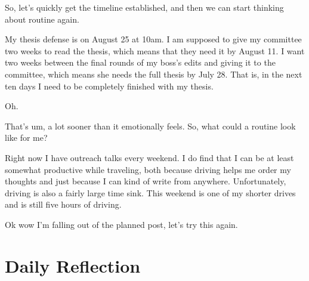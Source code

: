 \documentclass[12pt]{article}
\renewcommand{\,}{\textsuperscript{,}}
\begin{document}
So, let's quickly get the timeline established, and then we can start thinking about routine again.

My thesis defense is on August 25 at 10am.  
I am supposed to give my committee two weeks to read the thesis, which means that they need it by August 11.  
I want two weeks between the final rounds of my boss's edits and giving it to the committee, which means she needs the full thesis by July 28.  
That is, in the next ten days I need to be completely finished with my thesis.

Oh.

That's um, a lot sooner than it emotionally feels.  
So, what could a routine look like for me?

Right now I have outreach talks every weekend.  
I do find that I can be at least somewhat productive while traveling, both because driving helps me order my thoughts and just because I can kind of write from anywhere.  
Unfortunately, driving is also a fairly large time sink.  
This weekend is one of my shorter drives and is still five hours of driving.

Ok wow I'm falling out of the planned post, let's try this again.

\section{Daily Reflection}
\end{document}
